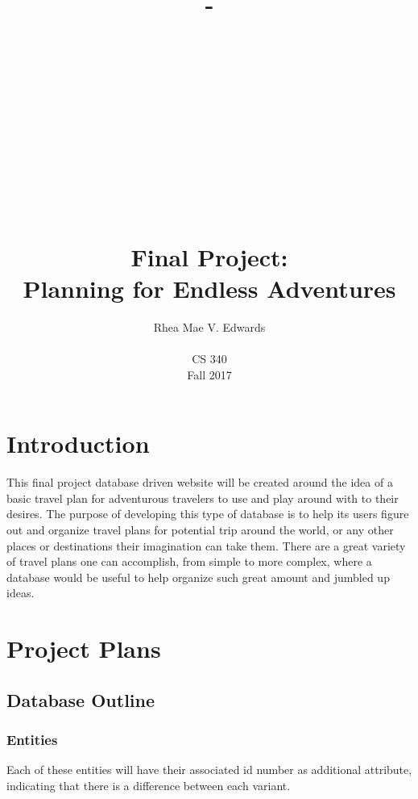 \documentclass[letterpaper,10pt,onecolumn,compsoc]{IEEEtran}
\title{-\\ ~ \\ ~ \\ ~ \\ ~ \\ ~ \\~ \\ ~ \\Final Project:\\Planning for Endless Adventures}
\author{Rhea Mae V. Edwards\\ ~ \\CS 340\\Fall 2017}
\begin{document}
\maketitle

\newpage


\tableofcontents

\newpage

\section{Introduction}


\noindent
This final project database driven website will be created around the idea of a basic travel plan for adventurous travelers to use and play around with to their desires. The purpose of developing this type of database is to help its users figure out and organize travel plans for potential trip around the world, or any other places or destinations their imagination can take them. There are a great variety of travel plans one can accomplish, from simple to more complex, where a database would be useful to help organize such great amount and jumbled up ideas.

\section{Project Plans}


\subsection{Database Outline}


\subsubsection{Entities}

\noindent
Each of these entities will have their associated id number as additional attribute, indicating that there is a difference between each variant.
\end{document}
